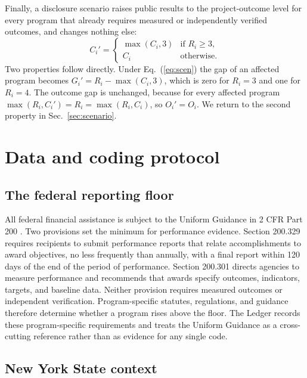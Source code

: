 \documentclass[10pt,twocolumn,letterpaper]{article}
\begin{document}
Finally, a disclosure scenario raises public results to the project-outcome level for every program that already requires measured or independently verified outcomes, and changes nothing else:
\begin{equation}
C_i' = \begin{cases} \max(C_i, 3) & \text{if } R_i \ge 3, \\ C_i & \text{otherwise.} \end{cases}
\label{eq:scen}
\end{equation}
Two properties follow directly. Under Eq.~(\ref{eq:scen}) the gap of an affected program becomes $G_i' = R_i - \max(C_i, 3)$, which is zero for $R_i = 3$ and one for $R_i = 4$. The outcome gap is unchanged, because for every affected program $\max(R_i, C_i') = R_i = \max(R_i, C_i)$, so $O_i' = O_i$. We return to the second property in Sec.~\ref{sec:scenario}.

\section{Data and coding protocol}\label{sec:data}

\subsection{The federal reporting floor}

All federal financial assistance is subject to the Uniform Guidance in 2 CFR Part 200 \cite{cfr200}. Two provisions set the minimum for performance evidence. Section 200.329 requires recipients to submit performance reports that relate accomplishments to award objectives, no less frequently than annually, with a final report within 120 days of the end of the period of performance. Section 200.301 directs agencies to measure performance and recommends that awards specify outcomes, indicators, targets, and baseline data. Neither provision requires measured outcomes or independent verification. Program-specific statutes, regulations, and guidance therefore determine whether a program rises above the floor. The Ledger records these program-specific requirements and treats the Uniform Guidance as a cross-cutting reference rather than as evidence for any single code.

\subsection{New York State context}
\end{document}
